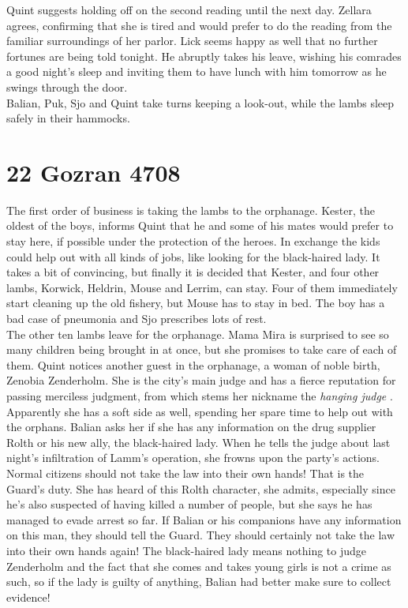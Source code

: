 Quint suggests holding off on the second reading until the next day. Zellara agrees, confirming that she is tired and would prefer to do the reading from the familiar surroundings of her parlor. Lick seems happy as well that no further fortunes are being told tonight. He abruptly takes his leave, wishing his comrades a good night's sleep and inviting them to have lunch with him tomorrow as he swings through the door.\\

Balian, Puk, Sjo and Quint take turns keeping a look-out, while the lambs sleep safely in their hammocks.\\

\section{22 Gozran 4708}

The first order of business is taking the lambs to the orphanage. Kester, the oldest of the boys, informs Quint that he and some of his mates would prefer to stay here, if possible under the protection of the heroes. In exchange the kids could help out with all kinds of jobs, like looking for the black-haired lady. It takes a bit of convincing, but finally it is decided that Kester, and four other lambs, Korwick, Heldrin, Mouse and Lerrim, can stay. Four of them immediately start cleaning up the old fishery, but Mouse has to stay in bed. The boy has a bad case of pneumonia and Sjo prescribes lots of rest.\\

The other ten lambs leave for the orphanage. Mama Mira is surprised to see so many children being brought in at once, but she promises to take care of each of them. Quint notices another guest in the orphanage, a woman of noble birth, Zenobia Zenderholm. She is the city's main judge and has a fierce reputation for passing merciless judgment, from which stems her nickname the {\itshape hanging judge} . Apparently she has a soft side as well, spending her spare time to help out with the orphans. Balian asks her if she has any information on the drug supplier Rolth or his new ally, the black-haired lady. When he tells the judge about last night's infiltration of Lamm's operation, she frowns upon the party's actions. Normal citizens should not take the law into their own hands! That is the Guard's duty. She has heard of this Rolth character, she admits, especially since he's also suspected of having killed a number of people, but she says he has managed to evade arrest so far. If Balian or his companions have any information on this man, they should tell the Guard. They should certainly not take the law into their own hands again! The black-haired lady means nothing to judge Zenderholm and the fact that she comes and takes young girls is not a crime as such, so if the lady is guilty of anything, Balian had better make sure to collect evidence!\\

